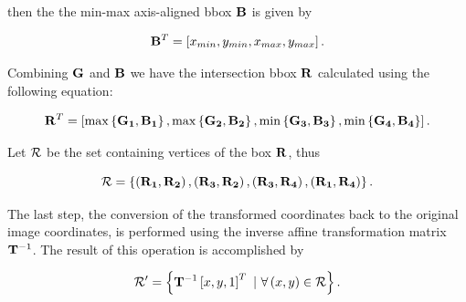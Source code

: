\noindent then the the min-max axis-aligned \gls{bbox} $\mathbf{B}$ is given by

\begin{equation}
    {\mathbf{B}}^T = \left[ {x_{min}, y_{min}, x_{max}, y_{max}} \right].
\end{equation}

\noindent Combining $\mathbf{G}$ and $\mathbf{B}$ we have the intersection \gls{bbox} $\mathbf{R}$ calculated using the following equation:

\begin{equation}
    {\mathbf{R}}^T = \left[ {
        \max \left\{ {\mathbf{G_1}, \mathbf{B_1}} \right\},
        \max \left\{ {\mathbf{G_2}, \mathbf{B_2}} \right\},
        \min \left\{ {\mathbf{G_3}, \mathbf{B_3}} \right\},
        \min \left\{ {\mathbf{G_4}, \mathbf{B_4}} \right\}
    } \right].
\end{equation}

\noindent Let $\mathcal{R}$ be the set containing vertices of the box $\mathbf{R}$, thus

\begin{equation}
    \mathcal{R} = \left\{ {
        \left( {\mathbf{R_1}, \mathbf{R_2}} \right),
        \left( {\mathbf{R_3}, \mathbf{R_2}} \right),
        \left( {\mathbf{R_3}, \mathbf{R_4}} \right),
        \left( {\mathbf{R_1}, \mathbf{R_4}} \right)
    } \right\}.
\end{equation}

\noindent The last step, the conversion of the transformed coordinates back to the original image coordinates, is performed using the inverse affine transformation matrix $\mathbf{T}^{-1}$. The result of this operation is accomplished by

\begin{equation}
    \mathcal{R'} =
    \left\{ {
        \mathbf{T}^{-1}
        \left[ {x, y, 1} \right]^T
        \ | \
        \forall \left( {x, y} \right) \in \mathcal{R}
    } \right\}.
\end{equation}

